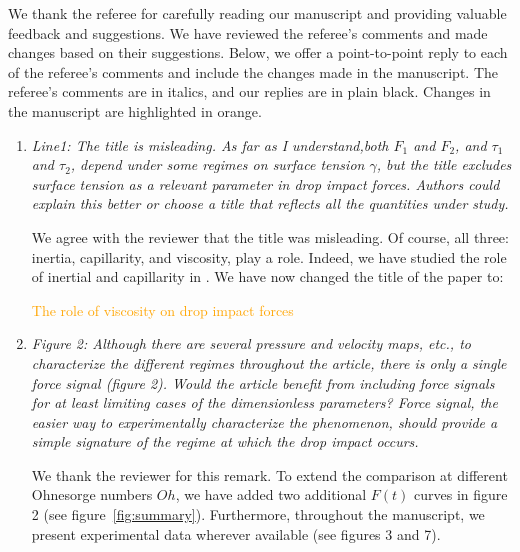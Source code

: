 \documentclass[]{article}
\newcommand{\VS}[1]{{\textcolor{orange}{#1}}}
\begin{document}
We thank the referee for carefully reading our manuscript and providing valuable feedback and suggestions. We have reviewed the referee's comments and made changes based on their suggestions. Below, we offer a point-to-point reply to each of the referee's comments and include the changes made in the manuscript. The referee's comments are in italics, and our replies are in plain black. Changes in the manuscript are highlighted in orange.

\begin{enumerate}
	\item \textit{Line1: The title is misleading. As far as I understand,both $F_1$ and $F_2$, and $\tau_1$ and $\tau_2$, depend under some regimes on surface tension $\gamma$, but the title excludes surface tension as a relevant parameter in drop impact forces. Authors could explain this better or choose a title that reflects all the quantities under study.}
	
	We agree with the reviewer that the title was misleading. Of course, all three: inertia, capillarity, and viscosity, play a role. Indeed, we have studied the role of inertial and capillarity in \citet{zhang2022impact}. We have now changed the title of the paper to:
	
	\VS{The role of viscosity on drop impact forces}
	
	\item \textit{Figure 2: Although there are several pressure and velocity maps, etc., to characterize the different regimes throughout the article, there is only a single force signal (figure 2). Would the article benefit from including force signals for at least limiting cases of the dimensionless parameters? Force signal, the easier way to experimentally characterize the phenomenon, should provide a simple signature of the regime at which the drop impact occurs.}
	
	 We thank the reviewer for this remark. To extend the comparison at different Ohnesorge numbers $Oh$, we have added two additional $F(t)$ curves in figure 2 (see figure~\ref{fig:summary}). Furthermore, throughout the manuscript, we present experimental data wherever available (see figures 3 and 7). 
	 

\end{enumerate}
\end{document}
